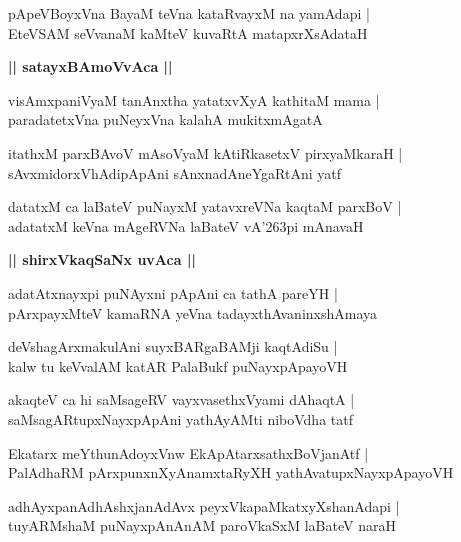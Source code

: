 \documentclass[twoside,12pt,openright]{book}
\def\S{\char'263}
\newcounter{shloka}[chapter]
\def\uvaca#1{\centerline{{\large\textbf{#1}}}}
\begin{document}
\begin{shloka}%
pApeVBoyxVna BayaM teVna kataRvayxM na yamAdapi |\\
EteVSAM seVvanaM kaMteV kuvaRtA matapxrXsAdataH 
\end{shloka}

\uvaca{|| satayxBAmoVvAca ||}

\begin{shloka}%
visAmxpaniVyaM tanAnxtha yatatxvXyA kathitaM mama |\\
paradatetxVna puNeyxVna kalahA mukitxmAgatA 
\end{shloka}

\begin{shloka}%
itathxM parxBAvoV mAsoVyaM kAtiRkasetxV pirxyaMkaraH |\\
sAvxmidorxVhAdipApAni sAnxnadAneYgaRtAni yatf
\end{shloka}

\begin{shloka}%
datatxM ca laBateV puNayxM yatavxreVNa kaqtaM parxBoV |\\
adatatxM keVna mAgeRVNa laBateV vA\S pi mAnavaH 
\end{shloka}

\uvaca{|| shirxVkaqSaNx uvAca ||}

\begin{shloka}%
adatAtxnayxpi puNAyxni pApAni ca tathA pareYH |\\
pArxpayxMteV kamaRNA yeVna tadayxthAvaninxshAmaya 
\end{shloka}

\begin{shloka}%
deVshagArxmakulAni suyxBARgaBAMji kaqtAdiSu |\\
kalw tu keVvalAM katAR PalaBukf puNayxpApayoVH 
\end{shloka}

\begin{shloka}%
akaqteV ca hi saMsageRV vayxvasethxVyami dAhaqtA |\\
saMsagARtupxNayxpApAni yathAyAMti niboVdha tatf 
\end{shloka}

\begin{shloka}%
Ekatarx meYthunAdoyxVnw EkApAtarxsathxBoVjanAtf |\\
PalAdhaRM pArxpunxnXyAnamxtaRyXH yathAvatupxNayxpApayoVH 
\end{shloka}

\begin{shloka}%
adhAyxpanAdhAshxjanAdAvx peyxVkapaMkatxyXshanAdapi |\\
tuyARMshaM puNayxpAnAnAM paroVkaSxM laBateV naraH 
\end{shloka}
\end{document}
